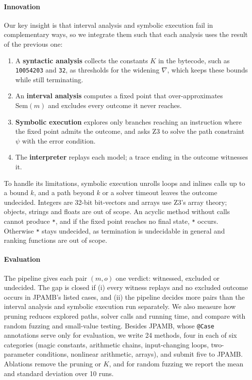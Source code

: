 \documentclass[review, nonacm, acmsmall]{acmart}
\begin{document}
\paragraph{Innovation}
Our key insight is that interval analysis and symbolic execution fail in
complementary ways, so we integrate them such that each analysis uses the
result of the previous one:
\begin{enumerate}
  \item A \textbf{syntactic analysis} collects the constants $K$ in the bytecode,
    such as \texttt{10054203} and \texttt{32}, as thresholds for the widening $\nabla$, which keeps these bounds while still
    terminating.
  \item An \textbf{interval analysis} computes a fixed point that
    over-approximates $\mathrm{Sem}(m)$ and excludes every outcome it never
    reaches.
  \item \textbf{Symbolic execution} explores only branches reaching an
    instruction where the fixed point admits the outcome, and asks Z3 to solve
    the path constraint $\psi$ with the error condition.
  \item The \textbf{interpreter} replays each model; a trace ending in the outcome
    witnesses it.
\end{enumerate}
To handle its limitations, symbolic execution unrolls loops and inlines calls
up to a bound $k$, and a path beyond $k$ or a solver timeout leaves the outcome
undecided. Integers are 32-bit bit-vectors and arrays use Z3's array theory;
objects, strings and floats are out of scope. An acyclic method without calls
cannot produce \texttt{*}, and if the fixed point reaches no final state,
\texttt{*} occurs. Otherwise \texttt{*} stays undecided, as termination is
undecidable in general and ranking functions are out of scope.

\paragraph{Evaluation}
The pipeline gives each pair $(m, o)$ one verdict: witnessed, excluded or
undecided. The gap is closed if (i) every witness replays and no excluded
outcome occurs in JPAMB's listed cases, and (ii) the pipeline decides more pairs
than the interval analysis and symbolic execution run separately. We also measure how pruning reduces explored paths, solver calls and running
time, and
compare with random fuzzing and small-value testing. Besides JPAMB, whose
\texttt{@Case} annotations serve only for evaluation, we write 24 methods, four
in each of six categories (magic constants, arithmetic chains, input-changing
loops, two-parameter conditions, nonlinear arithmetic, arrays), and submit five
to JPAMB. Ablations remove the pruning or $K$, and for random fuzzing we report the mean and standard deviation over 10 runs.
\end{document}
